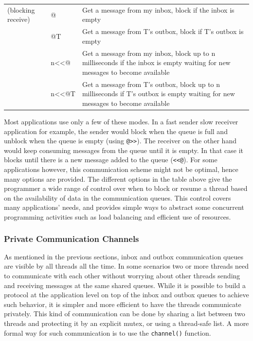 \begin{flushleft}
\begin{supertabular}{m{0.8920598in}m{0.8643598in}m{4.10186in}}
\centering (blocking receive) &
\centering {\textless}{\textless}@ &
Get a message from my inbox, block if the inbox is empty\\
 &
\centering {\textless}{\textless}@T &
Get a message from T{\textquoteright}s outbox, block if
T{\textquoteright}s outbox is empty\\
 &
\centering n{\textless}{\textless}@ &
Get a message from my inbox, block up to n milliseconds if the inbox is
empty waiting for new messages to become available\\
 &
\centering n{\textless}{\textless}@T &
Get a message from T{\textquoteright}s outbox, block up to n
milliseconds if T{\textquoteright}s outbox is empty waiting for new
messages to become available\\
\end{supertabular}
\end{flushleft}

\bigskip

Most applications use only a few of these modes. In a fast sender slow receiver
application for example, the sender would block when the queue is full
and unblock when the queue is empty (using
\texttt{@{\textgreater}{\textgreater}}). The receiver
on the other hand would keep consuming messages from the queue until it
is empty. In that case it blocks until there is a new message added to
the queue (\texttt{{\textless}{\textless}@}). For some
applications however, this communication scheme might not be optimal,
hence many options are provided. The different options in the table
above give the programmer a wide range of control over when to block or
resume a thread based on the availability of data in the communication
queues. This control covers many applications{\textquoteright} needs,
and provides simple ways to abstract some concurrent programming
activities such as load balancing and efficient use of resources.

\subsubsection{Private Communication Channels }

As mentioned in the previous sections, inbox and outbox communication
queues are visible by all threads all the time. In some scenarios two
or more threads need to communicate with each other without worrying
about other threads sending and receiving messages at the same shared
queues. While it is possible to build a protocol at the application
level on top of the inbox and outbox queues to achieve such behavior,
it is simpler and more efficient to have the threads communicate
privately. This kind of communication can be done by sharing a list
between two threads and protecting it by an explicit mutex, or using a
thread-safe list. A more formal way for such communication is to use
the \texttt{channel()} function. 

